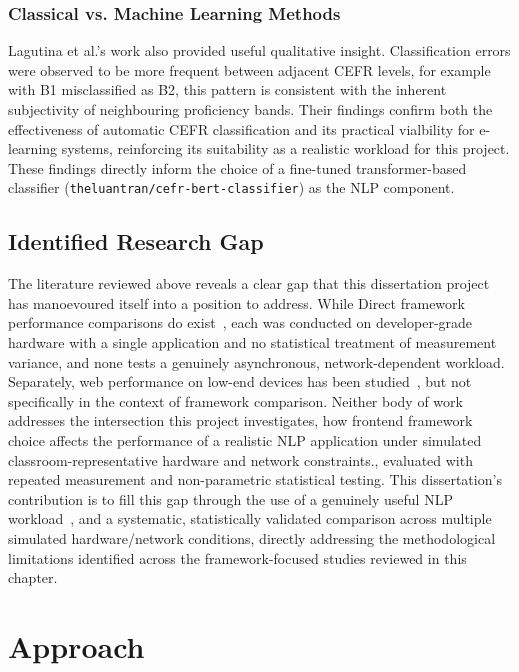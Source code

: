 \documentclass[11pt,a4paper]{report}
\begin{document}
\subsection{Classical vs. Machine Learning Methods}

Lagutina et al.'s work also provided useful qualitative insight. Classification errors were observed to be more frequent between adjacent CEFR levels, for example with B1 misclassified as B2, this pattern is consistent with the inherent subjectivity of neighbouring proficiency bands. Their findings confirm both the effectiveness of automatic CEFR classification and its practical vialbility for e-learning systems, reinforcing its suitability as a realistic workload for this project. These findings directly inform the choice of a fine-tuned transformer-based classifier (\texttt{theluantran/cefr-bert-classifier}) as the NLP component.


\section{Identified Research Gap}

The literature reviewed above reveals a clear gap that this dissertation project has manoevoured itself into a position to address. While Direct framework performance comparisons do exist~\cite{krause,chhetri,emmanni,loja-maita,comparative-frameworks}, each was conducted on developer-grade hardware with a single application and no statistical treatment of measurement variance, and none tests a genuinely asynchronous, network-dependent workload. Separately, web performance on low-end devices has been studied~\cite{maml}, but not specifically in the context of framework comparison. Neither body of work addresses the intersection this project investigates, how frontend framework choice 
affects the performance of a realistic NLP application under simulated classroom-representative hardware and network constraints., evaluated with repeated measurement and non-parametric statistical testing. This dissertation's contribution is to fill this gap through the use of a genuinely useful NLP workload~\cite{cefr-ml}, and a systematic, statistically validated comparison across multiple simulated hardware/network conditions, directly addressing the methodological limitations identified across the framework-focused studies reviewed in this chapter.


\chapter{Approach}
\label{ch:approach}
\end{document}
